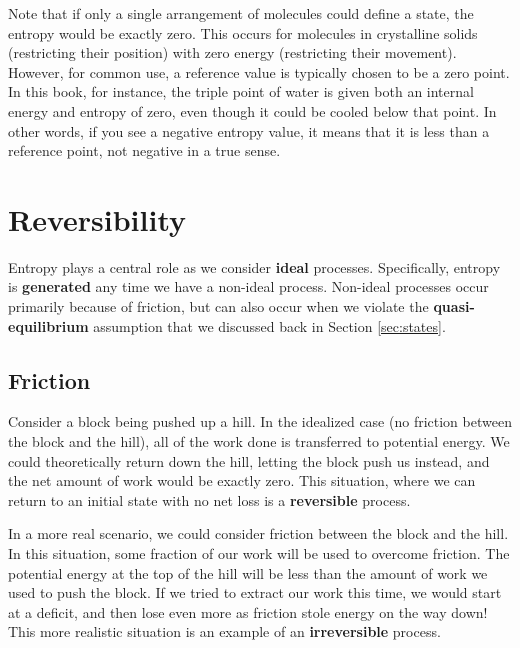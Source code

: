 Note that if only a single arrangement of molecules could define a state, the entropy would be exactly zero.  This occurs for molecules in crystalline solids (restricting their position) with zero energy (restricting their movement).  However, for common use, a reference value is typically chosen to be a zero point.  In this book, for instance, the triple point of water is given both an internal energy and entropy of zero, even though it could be cooled below that point.  In other words, if you see a negative entropy value, it means that it is less than a reference point, not negative in a true sense.


\section{Reversibility} \label{sec:reversibility}

Entropy plays a central role as we consider {\bf ideal} processes.  Specifically, entropy is {\bf generated} any time we have a non-ideal process.  Non-ideal processes occur primarily because of friction, but can also occur when we violate the {\bf quasi-equilibrium} assumption that we discussed back in Section \ref{sec:states}.

\subsection{Friction}

Consider a block being pushed up a hill.  In the idealized case (no friction between the block and the hill), all of the work done is transferred to potential energy.  We could theoretically return down the hill, letting the block push us instead, and the net amount of work would be exactly zero.  This situation, where we can return to an initial state with no net loss is a {\bf reversible} process.

In a more real scenario, we could consider friction between the block and the hill.  In this situation, some fraction of our work will be used to overcome friction.  The potential energy at the top of the hill will be less than the amount of work we used to push the block.  If we tried to extract our work this time, we would start at a deficit, and then lose even more as friction stole energy on the way down!  This more realistic situation is an example of an {\bf irreversible} process.

